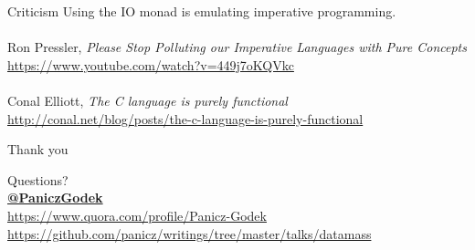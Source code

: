 \documentclass{beamer}
\begin{document}
\begin{frame}{Criticism}
  Using the IO monad is emulating imperative programming. \\ \pause
  \ \\
  Ron Pressler, \textit{Please Stop Polluting our Imperative Languages with Pure Concepts} \\
  \url{https://www.youtube.com/watch?v=449j7oKQVkc} \\ \pause
  \ \\
  Conal Elliott, \textit{The C language is purely functional} \\
  \url{http://conal.net/blog/posts/the-c-language-is-purely-functional}
  
\end{frame}

\begin{frame}{Thank you}
  \begin{center}
    \huge{Questions?}\\%
    \normalsize{\href{https://twitter.com/PaniczGodek}{\textbf{@PaniczGodek}}} \\
    {\url{https://www.quora.com/profile/Panicz-Godek}} \\
    {\url{https://github.com/panicz/writings/tree/master/talks/datamass}}

  \end{center}

\end{frame}
\end{document}
